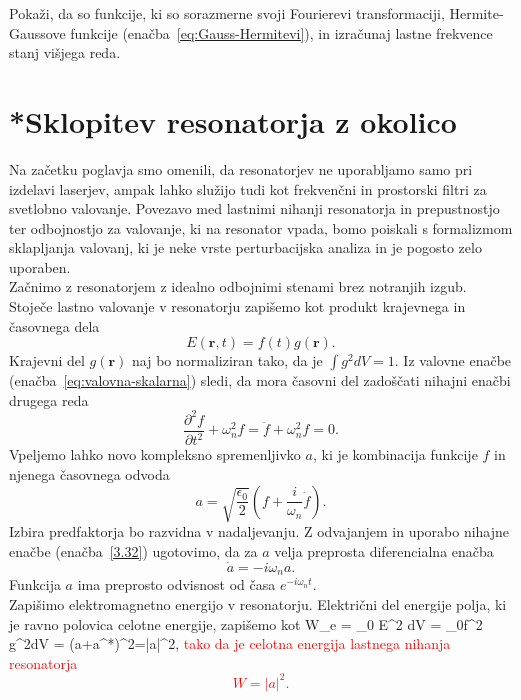 \begin{definition}
Pokaži, da so funkcije, ki so sorazmerne svoji Fourierevi transformaciji, 
Hermite-Gaussove funkcije (enačba~\ref{eq:Gauss-Hermitevi}), in 
izračunaj lastne frekvence stanj višjega reda.
\end{definition}

\section{*Sklopitev resonatorja z okolico}
Na začetku poglavja smo omenili, da resonatorjev ne uporabljamo samo pri 
izdelavi laserjev, ampak lahko služijo tudi kot frekvenčni in
prostorski filtri za svetlobno valovanje. Povezavo med lastnimi nihanji
resonatorja in prepustnostjo ter odbojnostjo za valovanje, ki na resonator
vpada, bomo poiskali s formalizmom sklapljanja valovanj, 
ki je neke vrste perturbacijska analiza in je pogosto zelo uporaben.\\

Začnimo z resonatorjem z idealno odbojnimi stenami brez notranjih izgub. Stoječe
lastno valovanje v resonatorju zapišemo kot produkt krajevnega in časovnega
dela
\begin{equation}
E(\mathbf{r},t)=f(t)g(\mathbf{r}).
\label{3.31}
\end{equation}
Krajevni del $g(\mathbf{r})$ naj bo normaliziran tako, da je $\int g^{2}dV=1$. Iz valovne
enačbe (enačba~\ref{eq:valovna-skalarna}) sledi, da mora časovni del zadoščati 
nihajni enačbi drugega reda
\begin{equation}
\frac{\partial^2 f}{\partial t^2}+\omega_{n}^{2}f= \ddot{f} + \omega_{n}^{2}f=0.
\label{3.32}
\end{equation}
Vpeljemo lahko novo kompleksno spremenljivko $a$, ki je kombinacija funkcije $f$ in njenega
časovnega odvoda
\begin{equation}
a=\sqrt{\frac{\epsilon_{0}}{2}}(f+\frac{i}{\omega_{n}}\dot{f}).
\label{3.33}
\end{equation}
Izbira predfaktorja bo razvidna v nadaljevanju. 
Z odvajanjem in uporabo nihajne enačbe (enačba~\ref{3.32}) ugotovimo, da za $a$ velja 
preprosta diferencialna enačba 
\begin{equation}
\dot{a}=-i\omega_{n}a.
\label{3.34}
\end{equation}
Funkcija $a$ ima preprosto odvisnost od časa $e^{-i\omega_{n}t}$. \\

Zapišimo elektromagnetno energijo v resonatorju. Električni
del energije polja, ki je ravno polovica celotne energije, zapišemo kot
\beq
W_e = \varepsilon_0 \int E^2 dV = \epsilon_{0}f^{2}
\int g^{2}dV =  (a+a^{*})^2=|a|^{2},
\eeq
\textcolor{red}{tako da je celotna energija lastnega nihanja resonatorja 
\begin{equation}
W=|a|^{2}.
\label{3.35}
\end{equation}}

